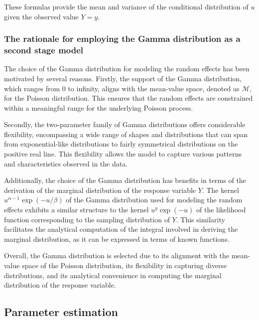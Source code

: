 \documentclass[preprint, 3p, authoryear]{elsarticle} %
\begin{document}
These formulas provide the mean and variance of the conditional distribution of \(u\) given the observed value \(Y=y\).

\hypertarget{the-rationale-for-employing-the-gamma-distribution-as-a-second-stage-model}{%
\subsubsection{The rationale for employing the Gamma distribution as a second stage model}\label{the-rationale-for-employing-the-gamma-distribution-as-a-second-stage-model}}

The choice of the Gamma distribution for modeling the random effects has been motivated by several reasons. Firstly, the support of the Gamma distribution, which ranges from 0 to infinity, aligns with the mean-value space, denoted as \(\mathcal{M}\), for the Poisson distribution. This ensures that the random effects are constrained within a meaningful range for the underlying Poisson process.

Secondly, the two-parameter family of Gamma distributions offers considerable flexibility, encompassing a wide range of shapes and distributions that can span from exponential-like distributions to fairly symmetrical distributions on the positive real line. This flexibility allows the model to capture various patterns and characteristics observed in the data.

Additionally, the choice of the Gamma distribution has benefits in terms of the derivation of the marginal distribution of the response variable \(Y\). The kernel \(u^{\alpha-1}\exp(-u/\beta)\) of the Gamma distribution used for modeling the random effects exhibits a similar structure to the kernel \(u^y\exp(-u)\) of the likelihood function corresponding to the sampling distribution of \(Y\). This similarity facilitates the analytical computation of the integral involved in deriving the marginal distribution, as it can be expressed in terms of known functions.

Overall, the Gamma distribution is selected due to its alignment with the mean-value space of the Poisson distribution, its flexibility in capturing diverse distributions, and its analytical convenience in computing the marginal distribution of the response variable.

\hypertarget{parameter-estimation}{%
\subsection{Parameter estimation}\label{parameter-estimation}}
\end{document}
